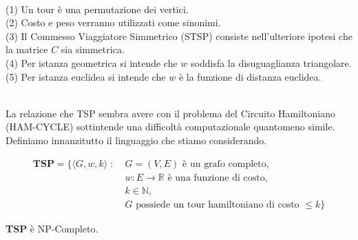 \begin{definition*}\ \\
    (1) Un tour è una permutazione dei vertici.\\
    (2) Costo e peso verranno utilizzati come sinonimi.\\
    (3) Il Commesso Viaggiatore Simmetrico (STSP) consiste nell'ulteriore ipotesi che la matrice $C$ sia simmetrica.\\
    (4) Per istanza geometrica si intende che $w$ soddisfa la disuguaglianza triangolare.\\
    (5) Per istanza euclidea si intende che $w$ è la funzione di distanza euclidea.
\end{definition*}
\ \\

La relazione che TSP sembra avere con il problema del Circuito Hamiltoniano (HAM-CYCLE) sottintende una 
difficoltà computazionale quantomeno simile. Definiamo innanzitutto il linguaggio che stiamo considerando.
\begin{definition}
    \begin{align*}
    \textbf{TSP} =\{\langle G,w,k\rangle \;:\; & G = (V,E) \text{ è un grafo completo},\\
                                            & w: E \rightarrow \mathbb{R} \text{ è una funzione di costo},\\
                                            & k \in \mathbb{N},\\
                                            & G \text{ possiede un tour hamiltoniano di costo } \leq k\}
    \end{align*}
\end{definition}

\begin{theorem}
    \textbf{TSP} è NP-Completo.
\end{theorem}

